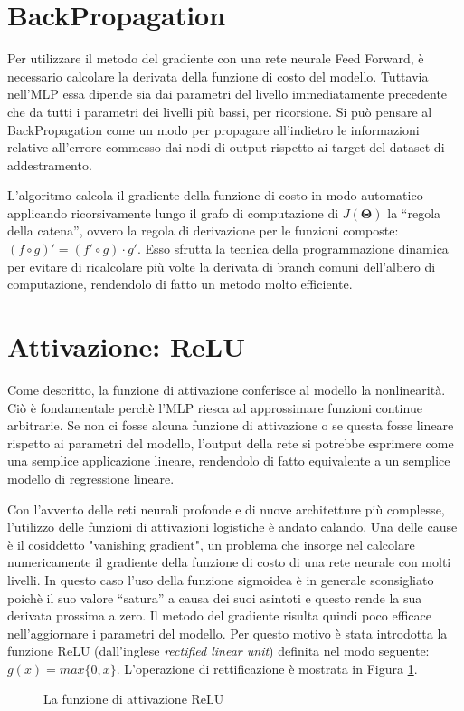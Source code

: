 \section{BackPropagation}
Per utilizzare il metodo del gradiente con una rete neurale Feed Forward, è
necessario calcolare la derivata della funzione di costo del modello. Tuttavia
nell'MLP essa dipende sia dai parametri del livello immediatamente precedente
che da tutti i parametri dei livelli più bassi, per ricorsione. Si può pensare
al BackPropagation come un modo per propagare all'indietro le informazioni
relative all'errore commesso dai nodi di output rispetto ai target del dataset
di addestramento.

L'algoritmo calcola il gradiente della funzione di costo in modo automatico
applicando ricorsivamente lungo il grafo di computazione di $J(\bm \Theta)$ la
``regola della catena'', ovvero la regola di derivazione per le funzioni
composte: $ (f \circ g)' = (f' \circ g)\cdot g' $. Esso sfrutta la tecnica
della programmazione dinamica per evitare di ricalcolare più volte la derivata
di branch comuni dell'albero di computazione, rendendolo di fatto un metodo
molto efficiente.
\section{Attivazione: ReLU}
Come descritto, la funzione di attivazione conferisce al modello la
nonlinearità. Ciò è fondamentale perchè l'MLP riesca ad approssimare funzioni
continue arbitrarie. Se non ci fosse alcuna funzione di attivazione o se questa
fosse lineare rispetto ai parametri del modello, l'output della rete si
potrebbe esprimere come una semplice applicazione lineare, rendendolo di fatto
equivalente a un semplice modello di regressione lineare.

Con l'avvento delle reti neurali profonde e di nuove architetture più
complesse, l'utilizzo delle funzioni di attivazioni logistiche è andato
calando. Una delle cause è il cosiddetto "vanishing gradient", un problema che
insorge nel calcolare numericamente il gradiente della funzione di costo di una
rete neurale con molti livelli. In questo caso l'uso della funzione sigmoidea è
in generale sconsigliato poichè il suo valore ``satura'' a causa dei suoi
asintoti e questo rende la sua derivata prossima a zero. Il metodo del
gradiente risulta quindi poco efficace nell'aggiornare i parametri del modello.
Per questo motivo è stata introdotta la funzione ReLU (dall'inglese
\emph{rectified linear unit}) definita nel modo seguente: 
$g(x) = max\{0, x\}$. L'operazione di rettificazione è mostrata in Figura
\ref{fig:relu}.
\begin{figure}[H]
  \caption{La funzione di attivazione ReLU}
  \label{fig:relu}
\end{figure}

